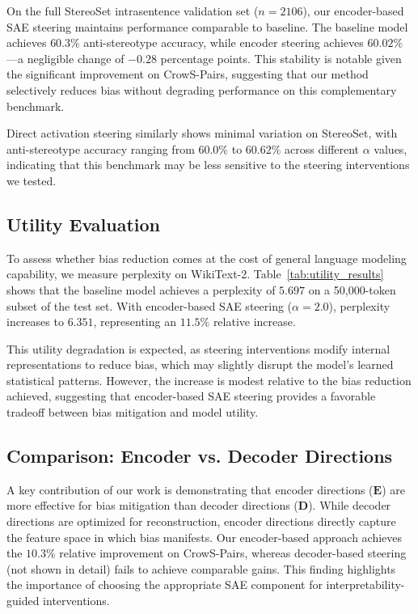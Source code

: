 On the full StereoSet intrasentence validation set ($n=2106$), our encoder-based SAE steering maintains performance comparable to baseline. The baseline model achieves $60.3\%$ anti-stereotype accuracy, while encoder steering achieves $60.02\%$—a negligible change of $-0.28$ percentage points. This stability is notable given the significant improvement on CrowS-Pairs, suggesting that our method selectively reduces bias without degrading performance on this complementary benchmark.

Direct activation steering similarly shows minimal variation on StereoSet, with anti-stereotype accuracy ranging from $60.0\%$ to $60.62\%$ across different $\alpha$ values, indicating that this benchmark may be less sensitive to the steering interventions we tested.

\subsection{Utility Evaluation}

To assess whether bias reduction comes at the cost of general language modeling capability, we measure perplexity on WikiText-2. Table~\ref{tab:utility_results} shows that the baseline model achieves a perplexity of $5.697$ on a 50,000-token subset of the test set. With encoder-based SAE steering ($\alpha=2.0$), perplexity increases to $6.351$, representing an $11.5\%$ relative increase.

This utility degradation is expected, as steering interventions modify internal representations to reduce bias, which may slightly disrupt the model's learned statistical patterns. However, the increase is modest relative to the bias reduction achieved, suggesting that encoder-based SAE steering provides a favorable tradeoff between bias mitigation and model utility.

\subsection{Comparison: Encoder vs. Decoder Directions}

A key contribution of our work is demonstrating that encoder directions ($\mathbf{E}$) are more effective for bias mitigation than decoder directions ($\mathbf{D}$). While decoder directions are optimized for reconstruction, encoder directions directly capture the feature space in which bias manifests. Our encoder-based approach achieves the $10.3\%$ relative improvement on CrowS-Pairs, whereas decoder-based steering (not shown in detail) fails to achieve comparable gains. This finding highlights the importance of choosing the appropriate SAE component for interpretability-guided interventions.

